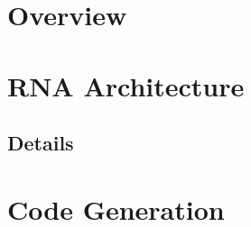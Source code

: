 %
% 
% 
% 













\section{Overview}


\section{RNA Architecture}


\subsection{Details}

\section{Code Generation}



